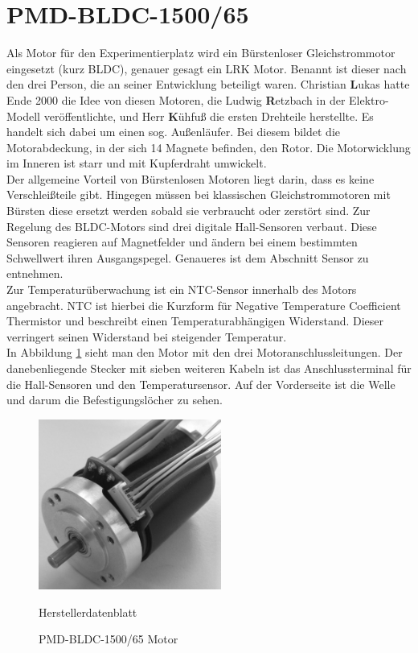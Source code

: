 \newpage
\section{PMD-BLDC-1500/65}
Als Motor für den Experimentierplatz wird ein Bürstenloser Gleichstrommotor eingesetzt (kurz BLDC), genauer gesagt ein LRK Motor. 
Benannt ist dieser nach den drei Person, die an seiner Entwicklung beteiligt waren.
Christian \textbf{L}ukas hatte Ende 2000 die Idee von diesen Motoren, die Ludwig \textbf{R}etzbach in der Elektro-Modell veröffentlichte, und Herr \textbf{K}ühfuß die ersten Drehteile herstellte.
Es handelt sich dabei um einen sog. Außenläufer.
Bei diesem bildet die Motorabdeckung, in der sich 14 Magnete befinden, den Rotor.
Die Motorwicklung im Inneren ist starr und mit Kupferdraht umwickelt.\\


Der allgemeine Vorteil von Bürstenlosen Motoren liegt darin, dass es keine Verschleißteile gibt.
Hingegen müssen bei klassischen Gleichstrommotoren mit Bürsten diese ersetzt werden sobald sie verbraucht oder zerstört sind.
Zur Regelung des BLDC-Motors sind drei digitale Hall-Sensoren verbaut.
Diese Sensoren reagieren auf Magnetfelder und ändern bei einem bestimmten Schwellwert ihren Ausgangspegel.
Genaueres ist dem Abschnitt Sensor zu entnehmen.\\


Zur Temperaturüberwachung ist ein NTC-Sensor innerhalb des Motors angebracht. 
NTC ist hierbei die Kurzform für Negative Temperature Coefficient Thermistor und beschreibt einen Temperaturabhängigen Widerstand.
Dieser verringert seinen Widerstand bei steigender Temperatur.\\

In Abbildung \ref{fig:BLDC} sieht man den Motor mit den drei Motoranschlussleitungen.
Der danebenliegende Stecker mit sieben weiteren Kabeln ist das Anschlussterminal für die Hall-Sensoren und den Temperatursensor.
Auf der Vorderseite ist die Welle und darum die Befestigungslöcher zu sehen.

\begin{figure}[htbp]
	\centering
	\includegraphics[width=6cm]{hardware/graphics/BLDC_Motor}
	\caption{PMD-BLDC-1500/65 Motor}
	\quelle Herstellerdatenblatt
	\label{fig:BLDC}
\end{figure}

